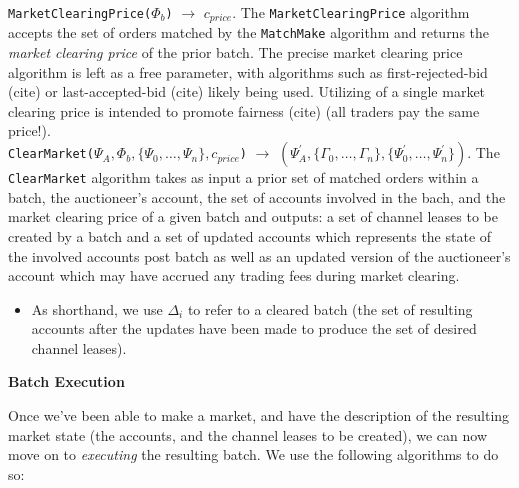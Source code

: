 \documentclass[10pt,a4paper]{article}
\theoremstyle{definition}
\begin{document}

 
\texttt{MarketClearingPrice($\Phi_b$)} $\rightarrow$ $c_{price}$. The
\texttt{MarketClearingPrice} algorithm accepts the set of orders matched by the
\texttt{MatchMake} algorithm and returns the \emph{market clearing price} of
the prior batch. The precise market clearing price algorithm is left as a free
parameter, with algorithms such as first-rejected-bid (cite) or
last-accepted-bid (cite) likely being used. Utilizing of a single market
clearing price is intended to promote fairness (cite) (all traders pay the same
price!).  \\



\texttt{ClearMarket($\Psi_{A}, \Phi_b, \{\Psi_0, \dots, \Psi_n\}, c_{price}$)}
$\rightarrow$ $(\Psi_{A}^\prime, \{\Gamma_0, \dots, \Gamma_n\},
\{\Psi_{0}^\prime, \dots, \Psi_{n}^\prime\})$. The \texttt{ClearMarket}
algorithm takes as input a prior set of matched orders within a batch, the
auctioneer's account, the set of accounts involved in the bach, and the market
clearing price of a given batch and outputs: a set of channel leases to be
created by a batch and a set of updated accounts which represents the state of
the involved accounts post batch as well as an updated version of the
auctioneer's account which may have accrued any trading fees during market
clearing.


\begin{itemize}
    \item As shorthand, we use $\Delta_i$ to refer to a cleared batch (the set of
            resulting accounts after the updates have been made to produce the
            set of desired channel leases).
\end{itemize}


\begin{center}
    \textbf{Batch Execution}
\end{center}

Once we've been able to make a market, and have the description of the
resulting market state (the accounts, and the channel leases to be created), we
can now move on to \emph{executing} the resulting batch. We use the following
algorithms to do so:  \\ 
\end{document}
